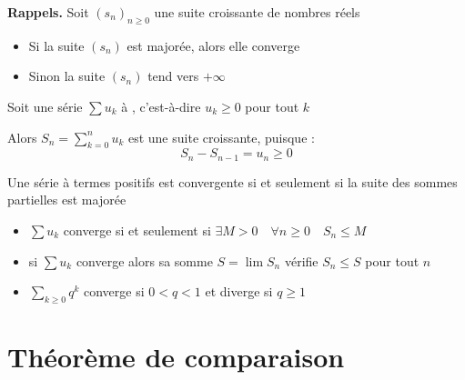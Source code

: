 \begin{frame}

\textbf{Rappels.}
Soit $(s_n)_{n\ge0}$ une suite croissante de nombres réels
\begin{itemize}
  \item\pause Si la suite $(s_n)$ est majorée, alors elle converge
  \item\pause Sinon la suite $(s_n)$ tend vers $+\infty$
\end{itemize}

\vspace{.3cm}
\pause

Soit une série $\sum u_k$ à , c'est-à-dire $u_k\ge 0$ pour tout $k$

\pause
Alors $S_n = \displaystyle\sum_{k=0}^n u_k$ est une suite croissante, puisque :
\vspace{-.3cm}
$$S_{n}-S_{n-1} = u_n \ge 0$$

\pause
\begin{proposition}
Une série à termes positifs est convergente si et seulement si 
la suite des sommes partielles est majorée
\end{proposition}

\begin{itemize}
  \item\pause $\sum u_k$ converge si et seulement si $\exists M>0 \quad \forall n\ge 0 \quad S_n \le M$
  \item\pause si $\sum u_k$ converge alors sa somme $S=\lim S_n$ vérifie $S_n \le S$ pour tout $n$
  \item\pause $\sum_{k\ge0} q^k$ converge si $0<q<1$ et diverge si $q \ge 1$
\end{itemize}

\end{frame}


\section{Théorème de comparaison}

